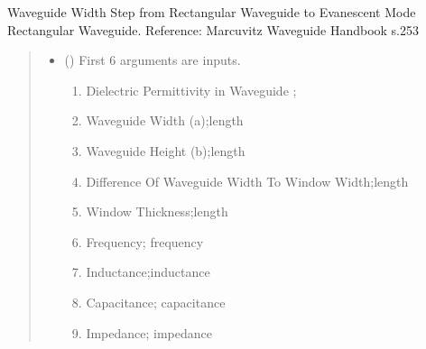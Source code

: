 \documentclass[letterpaper,10pt,english]{sphinxmanual}
\begin{document}

\begin{fulllineitems}
\label{\detokenize{components:components.InductiveWindowInWaveguide}}
\pysigstartsignatures
{}
\pysigstopsignatures
\sphinxAtStartPar
Waveguide Width Step from Rectangular Waveguide to Evanescent Mode Rectangular Waveguide.
Reference:  Marcuvitz Waveguide Handbook s.253
\begin{quote}\begin{description}
\begin{itemize}
\item {}
\sphinxAtStartPar
{} () \textendash{}
\sphinxAtStartPar
First 6 arguments are inputs.
\begin{enumerate}
%
\item {}
\sphinxAtStartPar
Dielectric Permittivity in Waveguide ;

\item {}
\sphinxAtStartPar
Waveguide Width (a);length

\item {}
\sphinxAtStartPar
Waveguide Height (b);length

\item {}
\sphinxAtStartPar
Difference Of Waveguide Width To Window Width;length

\item {}
\sphinxAtStartPar
Window Thickness;length

\item {}
\sphinxAtStartPar
Frequency; frequency

\item {}
\sphinxAtStartPar
Inductance;inductance

\item {}
\sphinxAtStartPar
Capacitance; capacitance

\item {}
\sphinxAtStartPar
Impedance; impedance

\end{enumerate}



\end{itemize}
\end{description}
\end{quote}
\end{fulllineitems}
\end{document}
